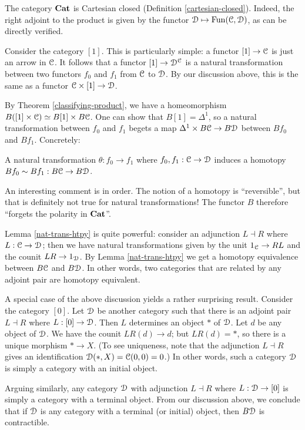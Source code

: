 The category $\mathbf{Cat}$ is Cartesian closed (Definition \ref{cartesian-closed}).
Indeed, the right adjoint to the product is given by the functor
$\mathcal D\mapsto\operatorname{Fun}(\mathcal C,\mathcal D)$, as can be directly verified.

Consider the category $[1]$. This is particularly simple: a functor $[1]\to\mathcal C$
is just an arrow in $\mathcal C$. It follows that a functor $[1]\to\mathcal D^\mathcal C$ is a
natural transformation between two functors $f_0$ and $f_1$ from $\mathcal C$ to
$\mathcal D$. By our discussion above, this is the same as a functor
$\mathcal C\times[1]\to\mathcal D$.

By Theorem \ref{classifying-product}, we have a homeomorphism $B([1]\times
\mathcal C)\simeq B[1]\times B\mathcal C$. One can show that $B[1] = \Delta^1$, so a natural
transformation between $f_0$ and $f_1$ begets a map $\Delta^1\times B\mathcal C\to
B\mathcal D$ between $Bf_0$ and $Bf_1$. Concretely:
\begin{lemma}\label{nat-trans-htpy}
    A natural transformation $\theta:f_0\to f_1$ where $f_0,f_1:\mathcal C\to\mathcal D$
    induces a homotopy $Bf_0\sim Bf_1:B\mathcal C\to B\mathcal D$.
\end{lemma}
An interesting comment is in order. The notion of a homotopy is ``reversible'',
but that is definitely not true for natural transformations! The functor $B$
therefore ``forgets the polarity in $\mathbf{Cat}$''.

Lemma \ref{nat-trans-htpy} is quite powerful: consider an adjunction $L\dashv
R$ where $L:\mathcal C\to \mathcal D$; then we have natural transformations given by the unit
$1_\mathcal C\to RL$ and the counit $LR\to 1_\mathcal D$. By Lemma \ref{nat-trans-htpy} we
get a homotopy equivalence between $B\mathcal C$ and $B\mathcal D$. In other words, two
categories that are related by any adjoint pair are homotopy equivalent.

A special case of the above discussion yields a rather surprising result.
Consider the category $[0]$. Let $\mathcal D$ be another category such that there is
an adjoint pair $L\dashv R$ where $L:[0]\to \mathcal D$. Then $L$ determines an object
$\ast$ of $\mathcal D$. Let $d$ be any object of $\mathcal D$. We have the counit $LR(d)\to
d$; but $LR(d) = \ast$, so there is a unique morphism $\ast\to X$. (To see
uniqueness, note that the adjunction $L\dashv R$ gives an identification
$\mathcal D(\ast,X) = \mathcal C(0,0) = 0$.) In other words, such a category $\mathcal D$ is simply
a category with an initial object.

Arguing similarly, any category $\mathcal D$ with adjunction $L\dashv R$ where
$L:\mathcal D\to [0]$ is simply a category with a terminal object. From our discussion
above, we conclude that if $\mathcal D$ is any category with a terminal (or initial)
object, then $B\mathcal D$ is contractible.
